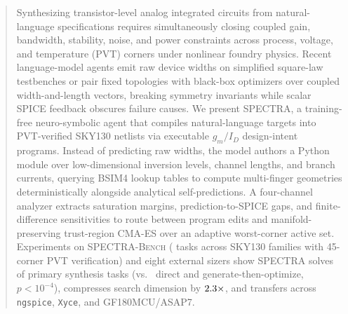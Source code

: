 \documentclass{article}
\theoremstyle{plain}
\begin{document}
\printAffiliationsAndNotice{}

\begin{abstract}
Synthesizing transistor-level analog integrated circuits from natural-language specifications requires simultaneously closing coupled gain, bandwidth, stability, noise, and power constraints across process, voltage, and temperature (PVT) corners under nonlinear foundry physics.
Recent language-model agents emit raw device widths on simplified square-law testbenches or pair fixed topologies with black-box optimizers over coupled width-and-length vectors, breaking symmetry invariants while scalar SPICE feedback obscures failure causes.
We present \textsc{SPECTRA}, a training-free neuro-symbolic agent that compiles natural-language targets into PVT-verified SKY130 netlists via executable $g_m/I_D$ design-intent programs.
Instead of predicting raw widths, the model authors a Python module over low-dimensional inversion levels, channel lengths, and branch currents, querying BSIM4 lookup tables to compute multi-finger geometries deterministically alongside analytical self-predictions.
A four-channel analyzer extracts saturation margins, prediction-to-SPICE gaps, and finite-difference sensitivities to route between program edits and manifold-preserving trust-region CMA-ES over an adaptive worst-corner active set.
Experiments on \textsc{SPECTRA-Bench} (\NTasksTotal{} tasks across \NPrimaryFamilies{} SKY130 families with 45-corner PVT verification) and eight external sizers show \textsc{SPECTRA} solves \SpectraPrim{} of primary synthesis tasks (vs.\ \DirectPrim{} direct and \GenboPrim{} generate-then-optimize, $p < 10^{-4}$), compresses search dimension by $\RawOverIntent{}\times$, and transfers across \texttt{ngspice}, \texttt{Xyce}, and GF180MCU/ASAP7.
\end{abstract}
\end{document}
